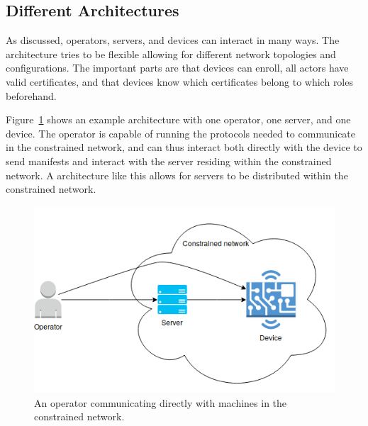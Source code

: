 \documentclass[0-thesis.tex]{subfiles}
\begin{document}




\subsection{Different Architectures}
\label{ssec:different-architectures}
As discussed, operators, servers, and devices can interact in many ways. The architecture
tries to be flexible allowing for different network topologies and configurations. The
important parts are that devices can enroll, all actors have valid certificates, and that
devices know which certificates belong to which roles beforehand. 

Figure~\ref{fig:operator-direct} shows an example architecture with one operator, one
server, and one device. The operator is capable of running the protocols needed to
communicate in the constrained network, and can thus interact both directly with the
device to send manifests and interact with the server residing within the constrained
network. A architecture like this allows for servers to be distributed within the
constrained network.

\begin{figure}
    \caption{An operator communicating directly with machines in the constrained network.}
    \label{fig:operator-direct}
    \includegraphics[scale=0.8]{images/operator-direct.png}
\end{figure}
\end{document}
